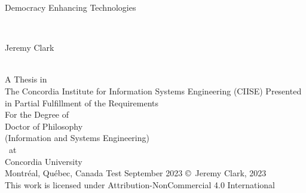 
\thispagestyle{empty} %

\begin{center} 
\begin{Large} Democracy Enhancing Technologies \end{Large}\\[3em]
\begin{large} Jeremy Clark \end{large}\\
\vfill
A Thesis in\\
The Concordia Institute for Information Systems Engineering (CIISE)
\vfill
Presented in Partial Fulfillment of the Requirements\\
For the Degree of\\
Doctor of Philosophy\\ 
(Information and Systems Engineering)\\~at\\
Concordia University\\
Montr\'{e}al, Qu\'{e}bec, Canada
Test
\vfill
September 2023
\vfill
\copyright~Jeremy Clark, 2023\\
This work is licensed under Attribution-NonCommercial 4.0 International
\end{center}

